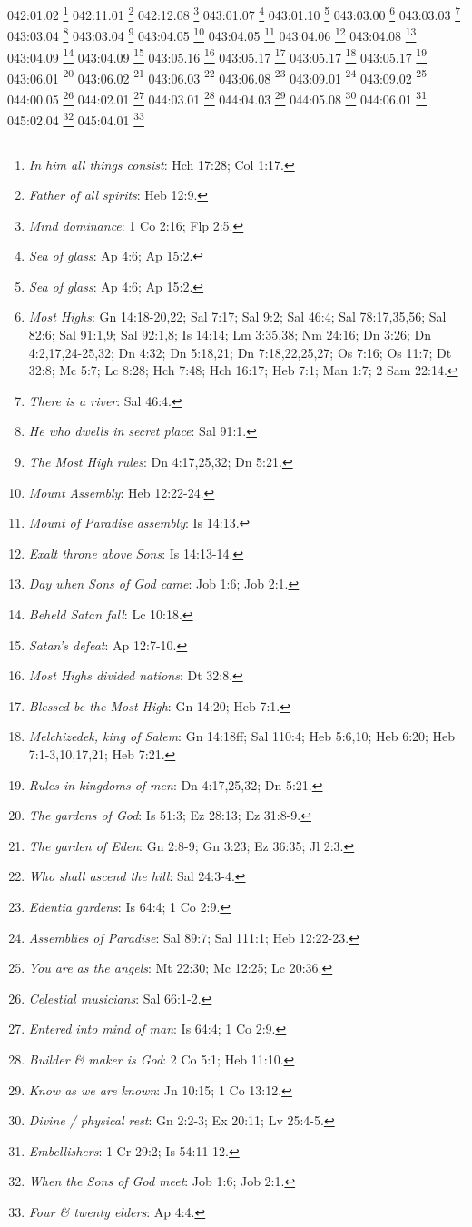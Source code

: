 042:01.02 \footnote{\textit{In him all things consist}: Hch 17:28; Col 1:17.}
042:11.01 \footnote{\textit{Father of all spirits}: Heb 12:9.}
042:12.08 \footnote{\textit{Mind dominance}: 1 Co 2:16; Flp 2:5.}
043:01.07 \footnote{\textit{Sea of glass}: Ap 4:6; Ap 15:2.}
043:01.10 \footnote{\textit{Sea of glass}: Ap 4:6; Ap 15:2.}
043:03.00 \footnote{\textit{Most Highs}: Gn 14:18-20,22; Sal 7:17; Sal 9:2; Sal 46:4; Sal 78:17,35,56; Sal 82:6; Sal 91:1,9; Sal 92:1,8; Is 14:14; Lm 3:35,38; Nm 24:16; Dn 3:26; Dn 4:2,17,24-25,32; Dn 4:32; Dn 5:18,21; Dn 7:18,22,25,27; Os 7:16; Os 11:7; Dt 32:8; Mc 5:7; Lc 8:28; Hch 7:48; Hch 16:17; Heb 7:1; Man 1:7; 2 Sam 22:14.}
043:03.03 \footnote{\textit{There is a river}: Sal 46:4.}
043:03.04 \footnote{\textit{He who dwells in secret place}: Sal 91:1.}
043:03.04 \footnote{\textit{The Most High rules}: Dn 4:17,25,32; Dn 5:21.}
043:04.05 \footnote{\textit{Mount Assembly}: Heb 12:22-24.}
043:04.05 \footnote{\textit{Mount of Paradise assembly}: Is 14:13.}
043:04.06 \footnote{\textit{Exalt throne above Sons}: Is 14:13-14.}
043:04.08 \footnote{\textit{Day when Sons of God came}: Job 1:6; Job 2:1.}
043:04.09 \footnote{\textit{Beheld Satan fall}: Lc 10:18.}
043:04.09 \footnote{\textit{Satan's defeat}: Ap 12:7-10.}
043:05.16 \footnote{\textit{Most Highs divided nations}: Dt 32:8.}
043:05.17 \footnote{\textit{Blessed be the Most High}: Gn 14:20; Heb 7:1.}
043:05.17 \footnote{\textit{Melchizedek, king of Salem}: Gn 14:18ff; Sal 110:4; Heb 5:6,10; Heb 6:20; Heb 7:1-3,10,17,21; Heb 7:21.}
043:05.17 \footnote{\textit{Rules in kingdoms of men}: Dn 4:17,25,32; Dn 5:21.}
043:06.01 \footnote{\textit{The gardens of God}: Is 51:3; Ez 28:13; Ez 31:8-9.}
043:06.02 \footnote{\textit{The garden of Eden}: Gn 2:8-9; Gn 3:23; Ez 36:35; Jl 2:3.}
043:06.03 \footnote{\textit{Who shall ascend the hill}: Sal 24:3-4.}
043:06.08 \footnote{\textit{Edentia gardens}: Is 64:4; 1 Co 2:9.}
043:09.01 \footnote{\textit{Assemblies of Paradise}: Sal 89:7; Sal 111:1; Heb 12:22-23.}
043:09.02 \footnote{\textit{You are as the angels}: Mt 22:30; Mc 12:25; Lc 20:36.}
044:00.05 \footnote{\textit{Celestial musicians}: Sal 66:1-2.}
044:02.01 \footnote{\textit{Entered into mind of man}: Is 64:4; 1 Co 2:9.}
044:03.01 \footnote{\textit{Builder & maker is God}: 2 Co 5:1; Heb 11:10.}
044:04.03 \footnote{\textit{Know as we are known}: Jn 10:15; 1 Co 13:12.}
044:05.08 \footnote{\textit{Divine / physical rest}: Gn 2:2-3; Ex 20:11; Lv 25:4-5.}
044:06.01 \footnote{\textit{Embellishers}: 1 Cr 29:2; Is 54:11-12.}
045:02.04 \footnote{\textit{When the Sons of God meet}: Job 1:6; Job 2:1.}
045:04.01 \footnote{\textit{Four & twenty elders}: Ap 4:4.}

